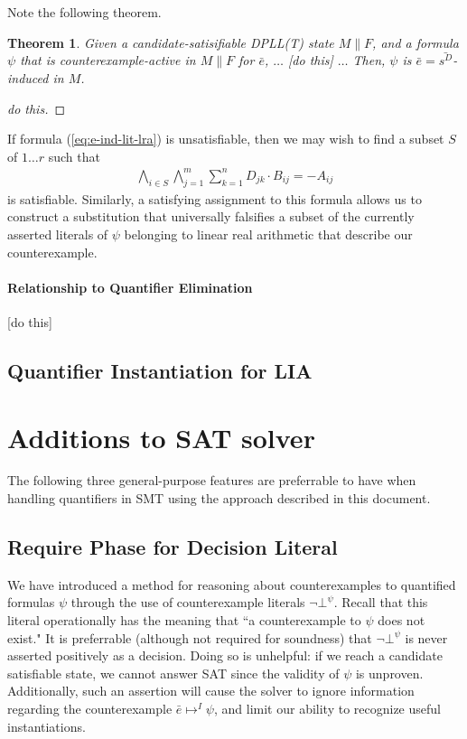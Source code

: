 \documentclass{llncs}
\newtheorem{thm}{Theorem}
\begin{document}
Note the following theorem.

\begin{thm}
Given a candidate-satisifiable DPLL(T) state $M \parallel F$, and a formula $\psi$ that is counterexample-active in $M \parallel F$ for $\bar{e}$,
$\ldots$ [do this] $\ldots$
Then, $\psi$ is $\bar{e} = \bar{s^D}$-induced in $M$.
\end{thm}
\begin{proof}
[do this]
\end{proof}

If formula (\ref{eq:e-ind-lit-lra}) is unsatisfiable, then we may wish to find a subset $S$ of $1 \ldots r$ such that 
\begin{eqnarray}
\displaystyle\bigwedge\limits_{i \in S} \displaystyle\bigwedge\limits_{j=1}^m \displaystyle\sum\limits_{k=1}^n D_{jk} \cdot B_{ij} = -A_{ij}
\end{eqnarray}
is satisfiable.  
Similarly, a satisfying assignment to this formula allows us to construct a substitution that universally falsifies a subset of the currently asserted literals of $\psi$ belonging to linear real arithmetic that describe our counterexample.

\paragraph{Relationship to Quantifier Elimination}

[do this]

\subsection{Quantifier Instantiation for LIA}


\section{Additions to SAT solver}
\label{sec:sat-add}

The following three general-purpose features are preferrable to have when handling quantifiers in SMT using the approach described in this document.

\subsection{Require Phase for Decision Literal}

We have introduced a method for reasoning about counterexamples to quantified formulas $\psi$ through the use of counterexample literals $\neg \bot^\psi$.
Recall that this literal operationally has the meaning that ``a counterexample to $\psi$ does not exist."
It is preferrable (although not required for soundness) that $\neg \bot^\psi$ is never asserted positively as a decision.
Doing so is unhelpful:  if we reach a candidate satisfiable state, we cannot answer SAT since the validity of $\psi$ is unproven.
Additionally, such an assertion will cause the solver to ignore information regarding the counterexample $\bar{e} \mapsto^I \psi$, and limit our ability to recognize useful instantiations.
\end{document}
